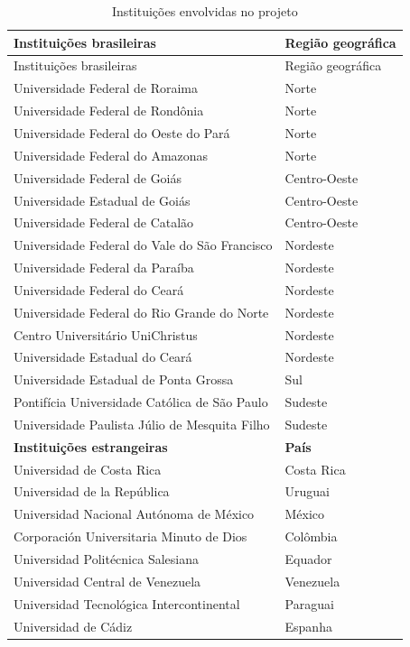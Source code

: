 \documentclass[
  a4paper,
]{book}
\begin{document}
\begin{longtable}[]{@{}ll@{}}
\caption{Instituições envolvidas no projeto}\label{tbl-1}\tabularnewline
\toprule\noalign{}
Instituições brasileiras & Região geográfica \\
\midrule\noalign{}
\endfirsthead
\toprule\noalign{}
Instituições brasileiras & Região geográfica \\
\midrule\noalign{}
\endhead
\bottomrule\noalign{}
\endlastfoot
Universidade Federal de Roraima & Norte \\
Universidade Federal de Rondônia & Norte \\
Universidade Federal do Oeste do Pará & Norte \\
Universidade Federal do Amazonas & Norte \\
Universidade Federal de Goiás & Centro-Oeste \\
Universidade Estadual de Goiás & Centro-Oeste \\
Universidade Federal de Catalão & Centro-Oeste \\
Universidade Federal do Vale do São Francisco & Nordeste \\
Universidade Federal da Paraíba & Nordeste \\
Universidade Federal do Ceará & Nordeste \\
Universidade Federal do Rio Grande do Norte & Nordeste \\
Centro Universitário UniChristus & Nordeste \\
Universidade Estadual do Ceará & Nordeste \\
Universidade Estadual de Ponta Grossa & Sul \\
Pontifícia Universidade Católica de São Paulo & Sudeste \\
Universidade Paulista Júlio de Mesquita Filho & Sudeste \\
\textbf{Instituições estrangeiras} & \textbf{País} \\
Universidad de Costa Rica & Costa Rica \\
Universidad de la República & Uruguai \\
Universidad Nacional Autónoma de México & México \\
Corporación Universitaria Minuto de Dios & Colômbia \\
Universidad Politécnica Salesiana & Equador \\
Universidad Central de Venezuela & Venezuela \\
Universidad Tecnológica Intercontinental & Paraguai \\
Universidad de Cádiz & Espanha \\

\end{longtable}
\end{document}
